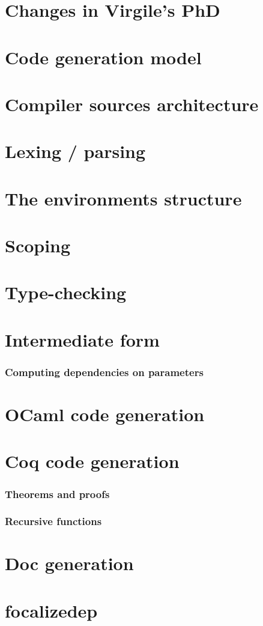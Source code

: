 \documentclass{book}
\begin{document}
\chapter{Changes in Virgile's PhD}


\chapter{Code generation model}


\chapter{Compiler sources architecture}


\chapter{Lexing / parsing}


\chapter{The environments structure}


\chapter{Scoping}


\chapter{Type-checking}


\chapter{Intermediate form}
\subsection{Computing dependencies on parameters}

\chapter{OCaml code generation}

\chapter{Coq code generation}
\subsection{Theorems and proofs}
\subsection{Recursive functions}

\chapter{Doc generation}

\chapter{focalizedep}

\printindex
\end{document}
